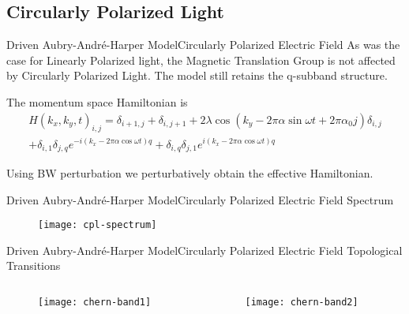 \documentclass{beamer}
\begin{document}
\subsection{Circularly Polarized Light}
\begin{frame}{Driven Aubry-Andr\'e-Harper Model}{Circularly Polarized Electric Field}
As was the case for Linearly Polarized light, the Magnetic Translation Group is not affected by
Circularly Polarized Light. The model still retains the q-subband structure.

The momentum space Hamiltonian is
\begin{equation}
 \begin{split} H(k_x, k_y, t)_{i,j} = 
                   \delta_{i+1,j} + \delta_{i,j+1} + 2 \lambda \cos(k_y - 2\pi\alpha\sin{\omega t} + 2\pi\alpha_0 j)\delta_{i,j} \\
                   + \delta_{i,1}\delta_{j,q} e^{-i(k_x -2\pi\alpha\cos{\omega t})q}+\delta_{i,q}\delta_{j,1} e^{i(k_x -2\pi\alpha\cos{\omega t})q}
                  \end{split}
\end{equation}

Using BW perturbation we perturbatively obtain the effective Hamiltonian.
\end{frame}

\begin{frame}{Driven Aubry-Andr\'e-Harper Model}{Circularly Polarized Electric Field}
 \alert{Spectrum}
 \begin{figure}[h]
 \centering
 \texttt{[image: cpl-spectrum]} 
\end{figure}
\end{frame}

\begin{frame}{Driven Aubry-Andr\'e-Harper Model}{Circularly Polarized Electric Field}
 \alert{Topological Transitions}
  \begin{columns}
  \begin{column}{0.5\textwidth}
   \begin{figure}[h]
 \centering
 \texttt{[image: chern-band1]}
\end{figure}
  \end{column}
  \begin{column}{0.5\textwidth}
      \begin{figure}[h]
 \centering
 \texttt{[image: chern-band2]}
\end{figure}
  \end{column}
 \end{columns}
\end{frame}
\end{document}

